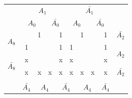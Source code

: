 \documentclass[a4paper,14pt]{article}
\begin{document}
\begin{table}[!htb]
\begin{minipage}{.5\linewidth}
		\begin{tabular}{cccccccccc}
			& \multicolumn{4}{c}{$A_1$}                                                                         & \multicolumn{4}{c}{$\bar{A_1}$}                                                                   &                        \\
			& \multicolumn{2}{c}{$A_0$}                       & \multicolumn{2}{c}{$\bar{A_0}$}                 & \multicolumn{2}{c}{$A_0$}                       & \multicolumn{2}{c}{$\bar{A_0}$}                 &                        \\ \cline{2-9}
			\multicolumn{1}{c|}{\multirow{2}{*}{$A_8$}}       & \multicolumn{1}{c|}{}  & \multicolumn{1}{c|}{1} & \multicolumn{1}{c|}{}  & \multicolumn{1}{c|}{1} & \multicolumn{1}{c|}{}  & \multicolumn{1}{c|}{1} & \multicolumn{1}{c|}{}  & \multicolumn{1}{c|}{1} & $\bar{A_2}$            \\ \cline{2-9}
			\multicolumn{1}{c|}{}                             & \multicolumn{1}{c|}{1} & \multicolumn{1}{c|}{}  & \multicolumn{1}{c|}{}  & \multicolumn{1}{c|}{1} & \multicolumn{1}{c|}{1} & \multicolumn{1}{c|}{}  & \multicolumn{1}{c|}{}  & \multicolumn{1}{c|}{1} & \multirow{2}{*}{$A_2$} \\ \cline{2-9}
			\multicolumn{1}{c|}{\multirow{2}{*}{$\bar{A_8}$}} & \multicolumn{1}{c|}{x} & \multicolumn{1}{c|}{}  & \multicolumn{1}{c|}{}  & \multicolumn{1}{c|}{x} & \multicolumn{1}{c|}{x} & \multicolumn{1}{c|}{}  & \multicolumn{1}{c|}{}  & \multicolumn{1}{c|}{x} &                        \\ \cline{2-9}
			\multicolumn{1}{c|}{}                             & \multicolumn{1}{c|}{x} & \multicolumn{1}{c|}{x} & \multicolumn{1}{c|}{x} & \multicolumn{1}{c|}{x} & \multicolumn{1}{c|}{x} & \multicolumn{1}{c|}{x} & \multicolumn{1}{c|}{x} & \multicolumn{1}{c|}{x} & $\bar{A_2}$            \\ \cline{2-9}
			\\
			& $\bar{A_4}$            & \multicolumn{2}{c}{$A_4$}                       & \multicolumn{2}{c}{$\bar{A_4}$}                 & \multicolumn{2}{c}{$A_4$}                       & $\bar{A_4}$            &                       
		\end{tabular}
	\end{minipage} 
\end{table}
\end{document}
